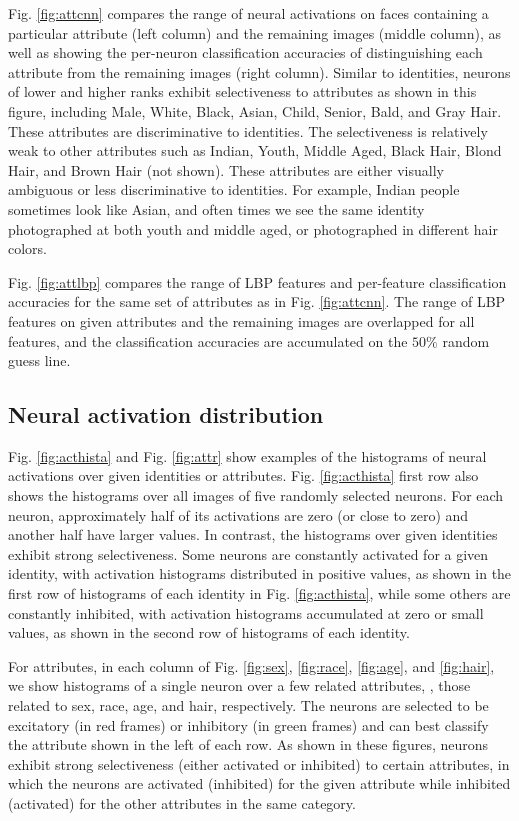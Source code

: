 \documentclass[10pt,twocolumn,letterpaper]{article}
\begin{document}
Fig. \ref{fig:attcnn} compares the range of neural activations on faces containing a particular attribute (left column) and the remaining images (middle column), as well as showing the per-neuron classification accuracies of distinguishing each attribute from the remaining images (right column). Similar to identities, neurons of lower and higher ranks exhibit selectiveness to attributes as shown in this figure, including Male, White, Black, Asian, Child, Senior, Bald, and Gray Hair. These attributes are discriminative to identities. The selectiveness is relatively weak to other attributes such as Indian, Youth, Middle Aged, Black Hair, Blond Hair, and Brown Hair (not shown). These attributes are either visually ambiguous or less discriminative to identities. For example, Indian people sometimes look like Asian, and often times we see the same identity photographed at both youth and middle aged, or photographed in different hair colors.

Fig. \ref{fig:attlbp} compares the range of LBP features and per-feature classification accuracies for the same set of attributes as in Fig. \ref{fig:attcnn}. The range of LBP features on given attributes and the remaining images are overlapped for all features, and the classification accuracies are accumulated on the $50\%$ random guess line.

\subsection{Neural activation distribution}
Fig. \ref{fig:acthista} and Fig. \ref{fig:attr} show examples of the histograms of neural activations over given identities or attributes. Fig. \ref{fig:acthista} first row also shows the histograms over all images of five randomly selected neurons. For each neuron, approximately half of its activations are zero (or close to zero) and another half have larger values. In contrast, the histograms over given identities exhibit strong selectiveness. Some neurons are constantly activated for a given identity, with activation histograms distributed in positive values, as shown in the first row of histograms of each identity in Fig. \ref{fig:acthista}, while some others are constantly inhibited, with activation histograms accumulated at zero or small values, as shown in the second row of histograms of each identity.

For attributes, in each column of Fig. \ref{fig:sex}, \ref{fig:race}, \ref{fig:age}, and \ref{fig:hair}, we show histograms of a single neuron over a few related attributes, \ie, those related to sex, race, age, and hair, respectively. The neurons are selected to be excitatory (in red frames) or inhibitory (in green frames) and can best classify the attribute shown in the left of each row. As shown in these figures, neurons exhibit strong selectiveness (either activated or inhibited) to certain attributes, in which the neurons are activated (inhibited) for the given attribute while inhibited (activated) for the other attributes in the same category.
\end{document}
